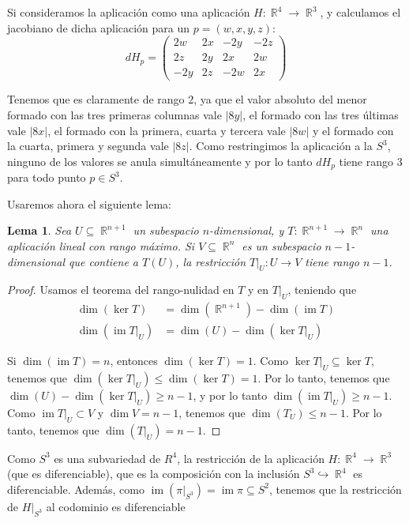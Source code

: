 \documentclass[11pt]{diazessay} %
\newtheorem{lemma}{Lema}
\DeclareMathOperator{\R}{\mathbb{R}}
\DeclareMathOperator{\im}{\textrm{im}}
\begin{document}
Si consideramos la aplicación como una aplicación $H:\R^4\to \R^3$, y calculamos el jacobiano de dicha aplicación para un $p=(w,x,y,z)$:
\[
    dH_{p}=\begin{pmatrix}
        2w  & 2x & -2y & -2z \\
        2z  & 2y & 2x  & 2w  \\
        -2y & 2z & -2w & 2x
    \end{pmatrix}
\]

Tenemos que es claramente de rango 2, ya que el valor absoluto del menor formado con las tres primeras columnas vale $|8y|$, el formado con las tres últimas vale $|8x|$, el formado con la primera, cuarta y tercera vale $|8w|$ y el formado con la cuarta, primera y segunda vale $|8z|$. Como restringimos la aplicación a la $S^3$, ninguno de los valores se anula simultáneamente y por lo tanto $dH_p$ tiene rango 3 para todo punto $p\in S^3$.

Usaremos ahora el siguiente lema:

\begin{lemma}
    Sea $U\subseteq \R^{n+1}$ un subespacio $n$-dimensional, y $T:\R^{n+1}\to\R^n$ una aplicación lineal con rango máximo. Si $V\subseteq \R^n$ es un subespacio $n-1$-dimensional que contiene a $T(U)$, la restricción $T|_U:U\to V$ tiene rango $n-1$.
\end{lemma}
\begin{proof}
    Usamos el teorema del rango-nulidad en $T$ y en $T|_U$, teniendo que
    \begin{align*}
        \dim(\ker T)   & = \dim(\R^{n+1}) - \dim(\im T) \\
        \dim(\im T|_U) & = \dim(U) - \dim(\ker T|_U)
    \end{align*}

    Si $\dim(\im T)=n$, entonces $\dim(\ker T)=1$. Como $\ker T|_U\subseteq \ker T$, tenemos que $\dim(\ker T|_U)\leq \dim(\ker T)=1$. Por lo tanto, tenemos que $\dim(U)-\dim(\ker T|_U) \geq n-1$, y por lo tanto $\dim(\im T|_U)\geq n-1$. Como $\im T|_U\subset V$ y $\dim V = n-1$, tenemos que $\dim(T_U)\leq n-1$. Por lo tanto, tenemos que $\dim(T|_U)=n-1$.
\end{proof}

Como $S^3$ es una subvariedad de $R^4$, la restricción de la aplicación $H:\R^4\to \R^3$ (que es diferenciable), que es la composición con la inclusión $S^3\hookrightarrow\R^4$ es diferenciable. Además, como $\im(\pi|_{S^3})=\im\pi\subseteq S^2$, tenemos que la restricción de $H|_{S^3}$ al codominio es diferenciable \cite[Corolario 1.29]{Oneill_1983}









\end{document}
